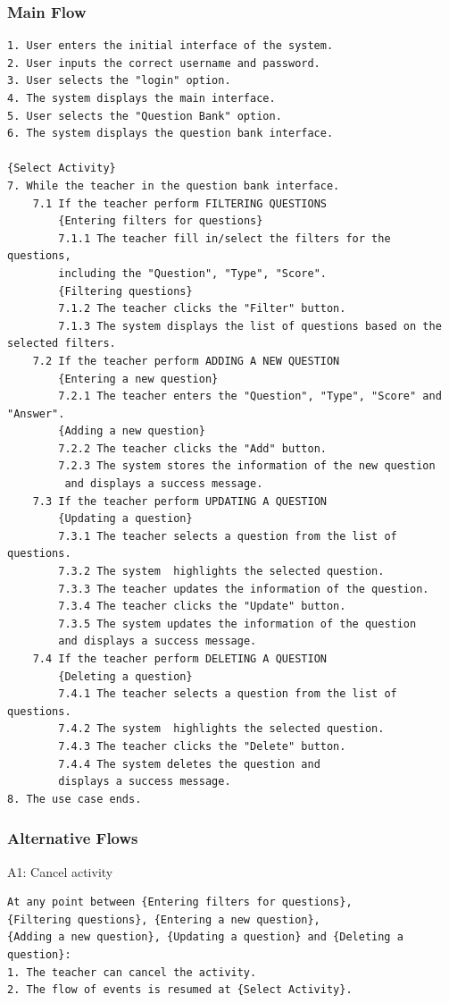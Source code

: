 \documentclass{article}
\begin{document}
\subsubsection{Main Flow}
\begin{verbatim}
1. User enters the initial interface of the system.
2. User inputs the correct username and password.
3. User selects the "login" option.
4. The system displays the main interface.
5. User selects the "Question Bank" option.
6. The system displays the question bank interface.

{Select Activity}
7. While the teacher in the question bank interface.
    7.1 If the teacher perform FILTERING QUESTIONS
        {Entering filters for questions}
        7.1.1 The teacher fill in/select the filters for the questions,
        including the "Question", "Type", "Score".
        {Filtering questions}
        7.1.2 The teacher clicks the "Filter" button.
        7.1.3 The system displays the list of questions based on the selected filters.
    7.2 If the teacher perform ADDING A NEW QUESTION
        {Entering a new question}
        7.2.1 The teacher enters the "Question", "Type", "Score" and "Answer".
        {Adding a new question}
        7.2.2 The teacher clicks the "Add" button.
        7.2.3 The system stores the information of the new question
         and displays a success message.
    7.3 If the teacher perform UPDATING A QUESTION
        {Updating a question}
        7.3.1 The teacher selects a question from the list of questions.
        7.3.2 The system  highlights the selected question.
        7.3.3 The teacher updates the information of the question.
        7.3.4 The teacher clicks the "Update" button.
        7.3.5 The system updates the information of the question 
        and displays a success message.
    7.4 If the teacher perform DELETING A QUESTION
        {Deleting a question}
        7.4.1 The teacher selects a question from the list of questions.
        7.4.2 The system  highlights the selected question.
        7.4.3 The teacher clicks the "Delete" button.
        7.4.4 The system deletes the question and 
        displays a success message.
8. The use case ends.    
\end{verbatim}
\subsubsection{Alternative Flows}
\noindent A1: Cancel activity
\begin{verbatim}
At any point between {Entering filters for questions},
{Filtering questions}, {Entering a new question},
{Adding a new question}, {Updating a question} and {Deleting a question}:
1. The teacher can cancel the activity.
2. The flow of events is resumed at {Select Activity}.
\end{verbatim}
\end{document}
